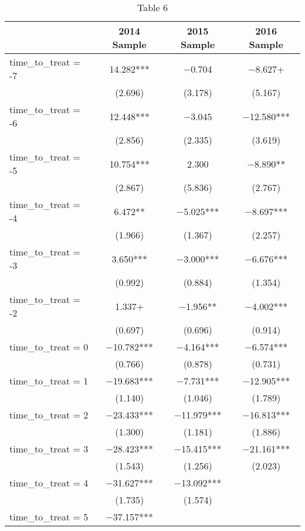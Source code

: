 \begin{table}

\caption{Table 6}
\centering
\begin{tabular}[t]{lccc}
\toprule
  & 2014 Sample & 2015 Sample & 2016 Sample\\
\midrule
time\_to\_treat = -7 & \num{14.282}*** & \num{-0.704} & \num{-8.627}+\\
 & (\num{2.696}) & (\num{3.178}) & (\num{5.167})\\
time\_to\_treat = -6 & \num{12.448}*** & \num{-3.045} & \num{-12.580}***\\
 & (\num{2.856}) & (\num{2.335}) & (\num{3.619})\\
time\_to\_treat = -5 & \num{10.754}*** & \num{2.300} & \num{-8.890}**\\
 & (\num{2.867}) & (\num{5.836}) & (\num{2.767})\\
time\_to\_treat = -4 & \num{6.472}** & \num{-5.025}*** & \num{-8.697}***\\
 & (\num{1.966}) & (\num{1.367}) & (\num{2.257})\\
time\_to\_treat = -3 & \num{3.650}*** & \num{-3.000}*** & \num{-6.676}***\\
 & (\num{0.992}) & (\num{0.884}) & (\num{1.354})\\
time\_to\_treat = -2 & \num{1.337}+ & \num{-1.956}** & \num{-4.002}***\\
 & (\num{0.697}) & (\num{0.696}) & (\num{0.914})\\
time\_to\_treat = 0 & \num{-10.782}*** & \num{-4.164}*** & \num{-6.574}***\\
 & (\num{0.766}) & (\num{0.878}) & (\num{0.731})\\
time\_to\_treat = 1 & \num{-19.683}*** & \num{-7.731}*** & \num{-12.905}***\\
 & (\num{1.140}) & (\num{1.046}) & (\num{1.789})\\
time\_to\_treat = 2 & \num{-23.433}*** & \num{-11.979}*** & \num{-16.813}***\\
 & (\num{1.300}) & (\num{1.181}) & (\num{1.886})\\
time\_to\_treat = 3 & \num{-28.423}*** & \num{-15.415}*** & \num{-21.161}***\\
 & (\num{1.543}) & (\num{1.256}) & (\num{2.023})\\
time\_to\_treat = 4 & \num{-31.627}*** & \num{-13.092}*** & \\
 & (\num{1.735}) & (\num{1.574}) & \\
time\_to\_treat = 5 & \num{-37.157}*** &  & \\

\end{tabular}
\end{table}
